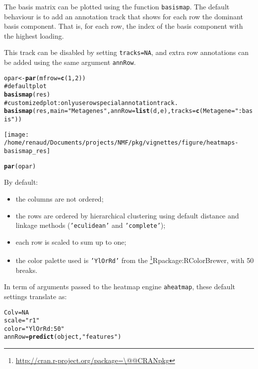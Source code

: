 \documentclass[a4paper]{article}\usepackage{graphicx, color}
\makeatletter
\def\maxwidth{ %
  \ifdim\Gin@nat@width>\linewidth
    \linewidth
  \else
    \Gin@nat@width
  \fi
}
\newcommand{\hlfunctioncall}[1]{\textcolor[rgb]{0.501960784313725,0,0.329411764705882}{\textbf{#1}}}%
\newcommand{\hlstring}[1]{\textcolor[rgb]{0.6,0.6,1}{#1}}%
\newcommand{\hlcomment}[1]{\textcolor[rgb]{0.180392156862745,0.6,0.341176470588235}{#1}}%
\newenvironment{kframe}{%
 \def\at@end@of@kframe{}%
 \ifinner\ifhmode%
  \def\at@end@of@kframe{\end{minipage}}%
  \begin{minipage}{\columnwidth}%
 \fi\fi%
 \def\FrameCommand##1{\hskip\@totalleftmargin \hskip-\fboxsep
 \colorbox{shadecolor}{##1}\hskip-\fboxsep
     \hskip-\linewidth \hskip-\@totalleftmargin \hskip\columnwidth}%
 \MakeFramed {\advance\hsize-\width
   \@totalleftmargin\z@ \linewidth\hsize
   \@setminipage}}%
 {\par\unskip\endMakeFramed%
 \at@end@of@kframe}
\newenvironment{knitrout}{}{} %
\let\code=\texttt
\newcommand{\pkgname}[1]{\textit{#1}\xspace}
\newcommand{\CRANurl}[1]{\url{http://cran.r-project.org/package=#1}}
\def\CRANpkg{\@ifstar\@CRANpkg\@@CRANpkg}
\def\@CRANpkg#1{\href{http://cran.r-project.org/package=#1}{\pkgname{#1}}\footnote{\CRANurl{#1}}}
\def\@@CRANpkg#1{\href{http://cran.r-project.org/package=#1}{\pkgname{#1}} package\footnote{\CRANurl{#1}}}
\def\citeCRANpkg{\@ifstar\@citeCRANpkg\@@citeCRANpkg}
\def\@citeCRANpkg#1{\CRANpkg{#1}\cite*{Rpackage:#1}}
\def\@@citeCRANpkg#1{\CRANpkg{#1}~\cite{Rpackage:#1}}
\renewcommand{\cite}[1]{\parencite{#1}}
\makeatother
\begin{document}
The basis matrix can be plotted using the function \code{basismap}. 
The default behaviour is to add an annotation track that shows for each row 
the dominant basis component.
That is, for each row, the index of the basis component with the highest 
loading.

This track can be disabled by setting \code{tracks=NA}, and extra 
row annotations can be added using the same argument \code{annRow}.

\begin{knitrout}
\color{fgcolor}\begin{kframe}
\begin{alltt}
opar <- \hlfunctioncall{par}(mfrow = \hlfunctioncall{c}(1, 2))
\hlcomment{# default plot}
\hlfunctioncall{basismap}(res)
\hlcomment{# customized plot: only use row special annotation track.}
\hlfunctioncall{basismap}(res, main = \hlstring{"Metagenes"}, annRow = \hlfunctioncall{list}(d, e), tracks = \hlfunctioncall{c}(Metagene = \hlstring{":basis"}))
\end{alltt}
\end{kframe}
\texttt{[image: /home/renaud/Documents/projects/NMF/pkg/vignettes/figure/heatmaps-basismap\_res]} 
\begin{kframe}\begin{alltt}
\hlfunctioncall{par}(opar)
\end{alltt}
\end{kframe}
\end{knitrout}


By default:
\begin{itemize}
\item the columns are not ordered;
\item the rows are ordered by hierarchical clustering using default distance and 
linkage methods (\code{'eculidean'} and \code{'complete'});
\item each row is scaled to sum up to one;
\item the color palette used is \code{'YlOrRd'} from the
\citeCRANpkg{RColorBrewer}, with 50 breaks.
\end{itemize}

In term of arguments passed to the heatmap engine \code{aheatmap}, these default 
settings translate as:

\begin{knitrout}
\color{fgcolor}\begin{kframe}
\begin{alltt}
Colv = NA
scale = \hlstring{"r1"}
color = \hlstring{"YlOrRd:50"}
annRow = \hlfunctioncall{predict}(object, \hlstring{"features"})
\end{alltt}
\end{kframe}
\end{knitrout}
\end{document}

